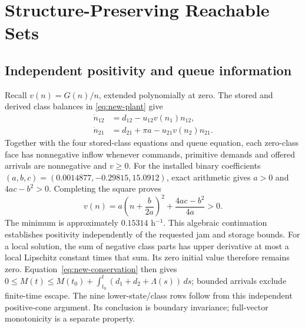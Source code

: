 \section{Structure-Preserving Reachable Sets}
\label{app:structure-proof}

\subsection{Independent positivity and queue information}

Recall $v(n)=G(n)/n$, extended polynomially at zero. The stored and derived
class balances in \eqref{eq:new-plant} give
\begin{equation}
 \begin{aligned}
 \dot n_{12}&=d_{12}-u_{12}v(n_1)n_{12},\\
 \dot n_{21}&=d_{21}+\pi a-u_{21}v(n_2)n_{21}.
 \end{aligned}
 \label{eq:structure-derived-classes}
\end{equation}
Together with the four stored-class equations and queue equation, each
zero-class face has nonnegative inflow whenever commands, primitive demands
and offered arrivals are nonnegative and $v\ge0$. For the installed
binary coefficients $(a,b,c)=(0.0014877,-0.29815,15.0912)$, exact arithmetic gives
$a>0$ and $4ac-b^2>0$. Completing the square proves
\begin{equation}
 v(n)=a\left(n+\frac{b}{2a}\right)^2+
                    \frac{4ac-b^2}{4a}>0.
 \label{eq:structure-positive-factor}
\end{equation}
The minimum is approximately $0.15314$ h$^{-1}$. This algebraic continuation
establishes positivity independently of the requested jam and storage bounds.
For a local solution, the sum of negative class parts has upper derivative
at most a local Lipschitz constant times that sum. Its zero initial value
therefore remains zero. Equation~\eqref{eq:new-conservation} then gives
$0\le M(t)\le M(t_0)+\int_{t_0}^t(d_1+d_2+\Lambda(s))\,ds$;
bounded arrivals exclude finite-time escape. The nine lower-state/class
rows follow from this independent positive-cone argument. Its conclusion
is boundary invariance; full-vector monotonicity is a separate property.

